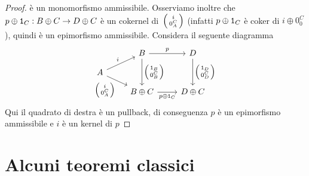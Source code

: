 \begin{proof}
  è un monomorfismo ammissibile. Osserviamo inoltre che \(p \oplus \mathtt 1_C : B
  \oplus C \to D \oplus C\) è un cokernel di~\(\begin{psmallmatrix} i \\
    0_A^C \end{psmallmatrix}\) (infatti \(p \oplus \mathtt 1_C\) è coker di \(i \oplus 0_0^C\)), quindi è un
  epimorfismo ammissibile. Considera il seguente diagramma
  \[
    \begin{tikzcd}[row sep=small, ampersand replacement=\&]
      \& B \ar["{\begin{psmallmatrix} \id_B \\
        0_B^C \end{psmallmatrix}}", dd]
    \ar["{p}", r] \& D \ar["{\begin{psmallmatrix} \id_D \\ 0_D^C \end{psmallmatrix}}", dd] \\
    A \ar["{i}", ur] \ar["{\begin{psmallmatrix} i \\ 0_A^C \end{psmallmatrix}}", dr, swap] \\
    \& B \oplus C \ar["{p \oplus \id_C}", r, swap] \& D \oplus C
  \end{tikzcd}
\]
Qui il quadrato di destra è un pullback, di conseguenza \(p\) è un
epimorfismo ammissibile e \(i\) è un kernel di \(p\)
\end{proof}



\section{Alcuni teoremi classici}

